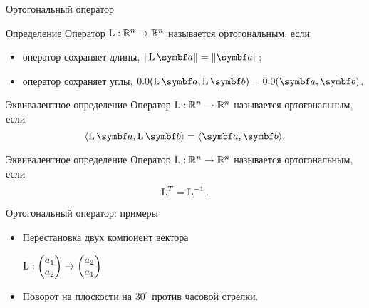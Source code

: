 \begin{frame}{Ортогональный оператор}

\begin{block}{Определение}
Оператор $\operatorname{L}: \mathbb{R}^n \to \mathbb{R}^n$ называется \alert{ортогональным}, если
\begin{itemize}
    \item оператор сохраняет длины, $\norm{\LL \ba} = \norm{\ba}$;
    \item оператор сохраняет углы, $\angle(\LL\ba, \LL \bb) = \angle(\ba, \bb)$.
\end{itemize}
\end{block}

\pause

\begin{block}{Эквивалентное определение} 
Оператор $\operatorname{L}: \mathbb{R}^n \to \mathbb{R}^n$ называется \alert{ортогональным}, если
\[
    \langle \LL \ba, \LL \bb\rangle = \langle \ba, \bb \rangle.
\]
\end{block}

\pause

\begin{block}{Эквивалентное определение} 
Оператор $\operatorname{L}: \mathbb{R}^n \to \mathbb{R}^n$ называется \alert{ортогональным}, если
\[
    \operatorname{L}^T = \operatorname{L}^{-1}.
\]
\end{block}


\end{frame}


\begin{frame}{Ортогональный оператор: примеры}


\begin{itemize}[<+->]
    \item Перестановка двух компонент вектора
    
    $\operatorname{L}: \begin{pmatrix}
        a_1 \\
        a_2
    \end{pmatrix} \to
    \begin{pmatrix}
        a_2 \\
        a_1
    \end{pmatrix}$

    \item Поворот на плоскости на $30^{\circ}$ против часовой стрелки.

\end{itemize}

\end{frame}
    



